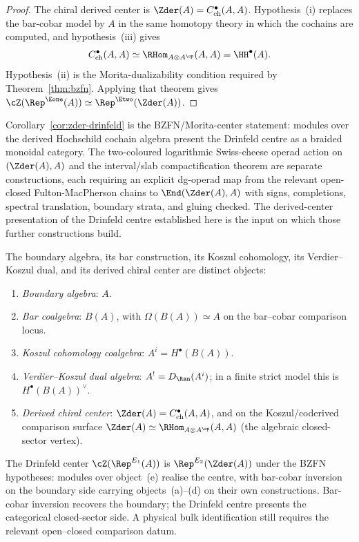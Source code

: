 \begin{proof}
The chiral derived center is
$\Zder(A)=C^\bullet_{\mathrm{ch}}(A,A)$. Hypothesis~(i) replaces
the bar-cobar model by $A$ in the same homotopy theory in which
the cochains are computed, and hypothesis~(iii) gives
\[
 C^\bullet_{\mathrm{ch}}(A,A)
 \simeq \RHom_{A\otimes A^{\op}}(A,A)
 = \HH^\bullet(A).
\]
Hypothesis~(ii) is the Morita-dualizability condition required by
Theorem~\ref{thm:bzfn}. Applying that theorem gives
$\cZ(\Rep^{\Eone}(A))\simeq\Rep^{\Etwo}(\Zder(A))$.
\end{proof}

\begin{remark}
\label{rem:center-not-swiss-cheese}
Corollary~\ref{cor:zder-drinfeld} is the BZFN/Morita-center statement:
modules over the derived Hochschild cochain algebra present the
Drinfeld centre as a braided monoidal category. The two-coloured
logarithmic Swiss-cheese operad action on $(\Zder(A), A)$ and the
interval/slab compactification theorem are separate constructions,
each requiring an explicit dg-operad map from the relevant open-closed
Fulton-MacPherson chains to $\End(\Zder(A), A)$ with signs,
completions, spectral translation, boundary strata, and gluing
checked. The derived-center presentation of the Drinfeld centre
established here is the input on which those further constructions
build.
\end{remark}

\begin{remark}
\label{rem:three-functors-drinfeld}
The boundary algebra, its bar construction, its Koszul cohomology,
its Verdier--Koszul dual, and its derived chiral center are distinct
objects:
\begin{enumerate}[label=(\alph*)]
 \item \emph{Boundary algebra}: $A$.
 \item \emph{Bar coalgebra}: $B(A)$, with
 $\Omega(B(A))\simeq A$ on the bar--cobar comparison locus.
 \item \emph{Koszul cohomology coalgebra}:
 $A^i = H^\bullet(B(A))$.
 \item \emph{Verdier--Koszul dual algebra}:
 $A^! = D_{\Ran}(A^i)$; in a finite strict model this is
 $H^\bullet(B(A))^\vee$.
 \item \emph{Derived chiral center}:
 $\Zder(A)=C^\bullet_{\mathrm{ch}}(A,A)$, and on the
 Koszul/coderived comparison surface
 $\Zder(A)\simeq\RHom_{A\otimes A^{\op}}(A,A)$
 (the algebraic closed-sector vertex).
\end{enumerate}
The Drinfeld center $\cZ(\Rep^{E_1}(A))$ is
$\Rep^{E_2}(\Zder(A))$ under the BZFN hypotheses: modules over
object~(e) realise the centre, with bar-cobar inversion on the
boundary side carrying objects~(a)--(d) on their own constructions.
Bar-cobar inversion recovers the boundary; the Drinfeld centre
presents the categorical closed-sector side. A physical bulk
identification still requires the relevant open--closed comparison
datum.
\end{remark}


